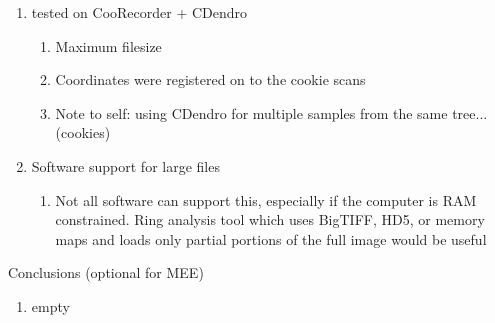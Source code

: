 \documentclass{article}
\begin{document}
\begin{outline}[enumerate]
\begin{enumerate}
\begin{enumerate}
\begin{enumerate}
			\end{enumerate}
		\end{enumerate}
	\item tested on CooRecorder + CDendro
		\begin{enumerate}
		\item Maximum filesize 
		\item Coordinates were registered on to the cookie scans 
		\item Note to self: using CDendro for multiple samples from the same tree... (cookies) 
		\end{enumerate}
	\item Software support for large files 
		\begin{enumerate}
		\item Not all software can support this, especially if the computer is RAM constrained. Ring analysis tool which uses BigTIFF, HD5, or memory maps and loads only partial portions of the full image would be useful
		\end{enumerate}
	\end{enumerate}
\item Conclusions (optional for MEE) %
	\begin{enumerate}
	\item empty
	\end{enumerate}
        
\end{outline}
\end{document}

